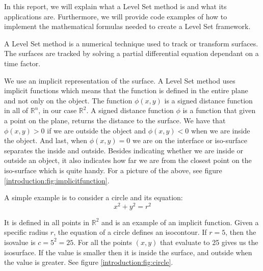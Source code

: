 In this report, we will explain what a Level Set method is and what its applications are. Furthermore, we will provide code examples of how to implement the mathematical formulas needed to create a Level Set framework. 

A Level Set method is a numerical technique used to track or transform surfaces. The surfaces are tracked by solving a partial differential equation dependant on a time factor. 

We use an implicit representation of the surface. A Level Set method uses implicit functions which means that the function is defined in the entire plane and not only on the object. The function $\phi(x,y)$ is a signed distance function in all of $\mathbb{R}^{n}$, in our case $\mathbb{R}^{2}$. A signed distance function $\phi$ is a function that given a point on the plane, returns the distance to the surface. We have that $\phi(x,y) > 0$ if we are outside the object and $\phi(x,y) < 0$ when we are inside the object. And last, when $\phi(x,y) = 0$ we are on the interface or iso-surface separates the inside and outside. Besides indicating whether we are inside or outside an object, it also indicates how far we are from the closest point on the iso-surface which is quite handy. For a picture of the above, see figure \ref{introduction:fig:implicitfunction}.



A simple example is to consider a circle and its equation:
\begin{equation*}
  x^{2} + y^{2} = r^{2}
\end{equation*}

It is defined in all points in $\mathbb{R}^{2}$ and is an example of an implicit function. Given a specific radius $r$, the equation of a circle defines an isocontour. If $r = 5$, then the isovalue is $c = 5^{2} = 25$. For all the points $(x,y)$ that evaluate to 25 gives us the isosurface. If the value is smaller then it is inside the surface, and outside when the value is greater. See figure \vref{introduction:fig:circle}.


